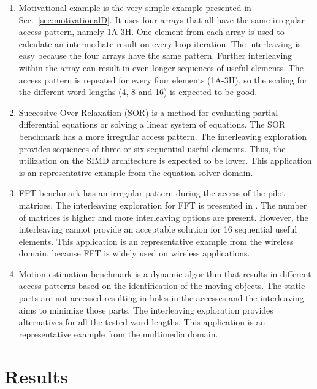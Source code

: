 \begin{enumerate}
\item Motivational example is the very simple example presented in Sec.~\ref{sec:motivationalD}. 
It uses four arrays that all have the same irregular access pattern, namely 1A-3H.
One element from each array is used to calculate an intermediate result on every loop iteration.
The interleaving is easy because the four arrays have the same pattern.
Further interleaving within the array can result in even longer sequences of useful elements.
The access pattern is repeated for every four elements (1A-3H), so the scaling for the different word lengths (4, 8 and 16) is expected to be good. 
\item Successive Over Relaxation (SOR)  is a method for evaluating partial differential equations or solving a linear system of equations.
The SOR benchmark has a more irregular access pattern.
The interleaving exploration provides sequences of three or six sequential useful elements.
Thus, the utilization on the SIMD architecture is expected to be lower.
This application is an representative example from the equation solver domain.
\item FFT  benchmark has an irregular pattern during the access of the pilot matrices. 
The interleaving exploration for FFT is presented in \cite{sharma2013data}.
The number of matrices is higher and more interleaving options are present.
However, the interleaving cannot provide an acceptable solution for 16 sequential useful elements.
This application is an representative example from the wireless domain, because FFT is widely used on wireless applications.
\item Motion estimation benchmark is a dynamic algorithm that results in different access patterns based on the identification of the moving objects. 
The static parts are not accessed resulting in holes in the accesses and the interleaving aims to minimize those parts.
The interleaving exploration provides alternatives for all the  tested word lengths. 
This application is an representative example from the multimedia domain.
\end{enumerate}

\section{Results}
\label{sec:resultsD}


